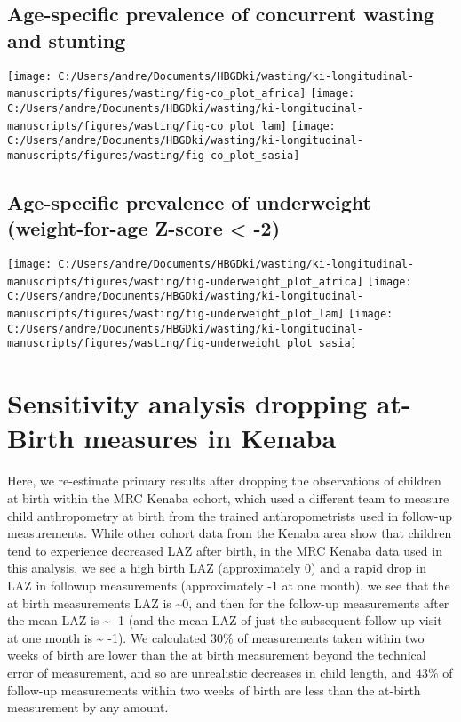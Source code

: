 \documentclass[
  9pt,
]{book}
\begin{document}
\hypertarget{age-specific-prevalence-of-concurrent-wasting-and-stunting-1}{%
\section{Age-specific prevalence of concurrent wasting and stunting}\label{age-specific-prevalence-of-concurrent-wasting-and-stunting-1}}

\texttt{[image: C:/Users/andre/Documents/HBGDki/wasting/ki-longitudinal-manuscripts/figures/wasting/fig-co\_plot\_africa]}
\texttt{[image: C:/Users/andre/Documents/HBGDki/wasting/ki-longitudinal-manuscripts/figures/wasting/fig-co\_plot\_lam]}
\texttt{[image: C:/Users/andre/Documents/HBGDki/wasting/ki-longitudinal-manuscripts/figures/wasting/fig-co\_plot\_sasia]}

\hypertarget{age-specific-prevalence-of-underweight-weight-for-age-z-score--2}{%
\section{Age-specific prevalence of underweight (weight-for-age Z-score \textless{} -2)}\label{age-specific-prevalence-of-underweight-weight-for-age-z-score--2}}

\texttt{[image: C:/Users/andre/Documents/HBGDki/wasting/ki-longitudinal-manuscripts/figures/wasting/fig-underweight\_plot\_africa]}
\texttt{[image: C:/Users/andre/Documents/HBGDki/wasting/ki-longitudinal-manuscripts/figures/wasting/fig-underweight\_plot\_lam]}
\texttt{[image: C:/Users/andre/Documents/HBGDki/wasting/ki-longitudinal-manuscripts/figures/wasting/fig-underweight\_plot\_sasia]}

\hypertarget{no-kenaba}{%
\chapter{Sensitivity analysis dropping at-Birth measures in Kenaba}\label{no-kenaba}}

\raggedright

Here, we re-estimate primary results after dropping the observations of children at birth within the MRC Kenaba cohort, which used a different team to measure child anthropometry at birth from the trained anthropometrists used in follow-up measurements. While other cohort data from the Kenaba area show that children tend to experience decreased LAZ after birth, in the MRC Kenaba data used in this analysis, we see a high birth LAZ (approximately 0) and a rapid drop in LAZ in followup measurements (approximately -1 at one month).
we see that the at birth measurements LAZ is \textasciitilde0, and then for the follow-up measurements after the mean LAZ is \textasciitilde{} -1 (and the mean LAZ of just the subsequent follow-up visit at one month is \textasciitilde{} -1). We calculated 30\% of measurements taken within two weeks of birth are lower than the at birth measurement beyond the technical error of measurement, and so are unrealistic decreases in child length, and 43\% of follow-up measurements within two weeks of birth are less than the at-birth measurement by any amount.
\end{document}
